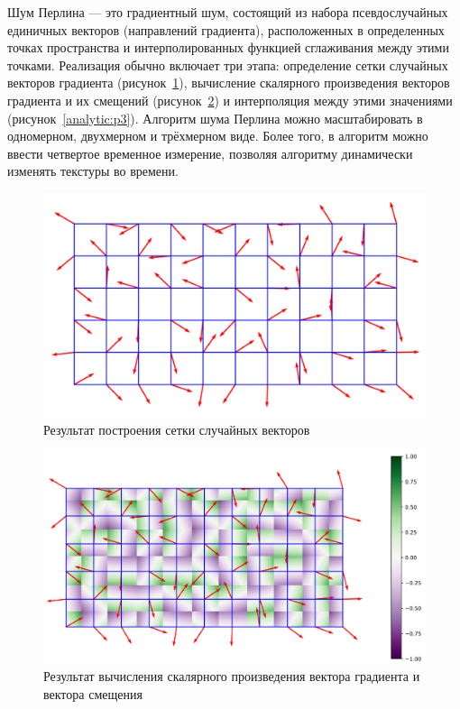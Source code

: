 \documentclass[a4paper, 14pt]{extreport}
\begin{document}
Шум Перлина --- это градиентный шум, состоящий из набора псевдослучайных единичных векторов (направлений градиента), 
расположенных в определенных точках пространства и интерполированных функцией сглаживания между этими точками. 
Реализация обычно включает три этапа: определение сетки случайных векторов градиента (рисунок~\ref{analytic:p1}), 
вычисление скалярного произведения векторов градиента и их смещений (рисунок~\ref{analytic:p2}) и интерполяция между 
этими значениями (рисунок~\ref{analytic:p3}). Алгоритм шума Перлина можно масштабировать в одномерном, двухмерном и 
трёхмерном виде. Более того, в алгоритм можно ввести четвертое временное измерение, позволяя алгоритму динамически 
изменять текстуры во времени.~\cite{landscape}

\begin{figure}[h]
	\centering
	\includegraphics[scale=0.4]{tools/perling_1.png}
	\caption{Результат построения сетки случайных векторов}
	\label{analytic:p1}
\end{figure}

\begin{figure}[h]
	\centering
	\includegraphics[scale=0.4]{tools/perling_2.png}
	\caption{Результат вычисления скалярного произведения вектора градиента и вектора смещения}
	\label{analytic:p2}
\end{figure}
\end{document}
